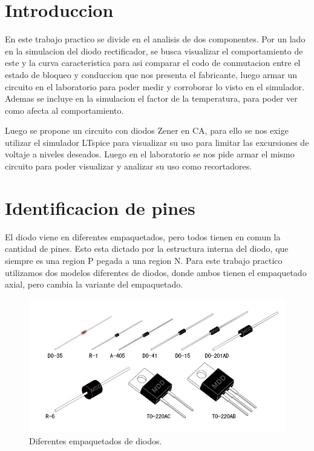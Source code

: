 \documentclass[chaptersright]{informeutn}
\begin{document}
  \maketitle

  \tableofcontents
  \setcounter{page}{1}
  \thispagestyle{plain}

  \chapter{Introduccion}
    En este trabajo practico se divide en el analisis de dos componentes. Por un lado en la simulacion del diodo
    rectificador, se busca visualizar el comportamiento de este y la curva caracteristica para asi comparar el codo de
    conmutacion entre el estado de bloqueo y conduccion que nos presenta el fabricante, luego armar un circuito en el
    laboratorio para poder medir y corroborar lo visto en el simulador. Ademas se incluye en la simulacion el factor de
    la temperatura, para poder ver como afecta al comportamiento.

    Luego se propone un circuito con diodos Zener en CA, para ello se nos exige utilizar el simulador LTspice para
    visualizar su uso para limitar las excursiones de voltaje a niveles deseados. Luego en el laboratorio se nos pide
    armar el mismo circuito para poder visualizar y analizar su uso como recortadores.

  \chapter{Identificacion de pines}
    El diodo viene en diferentes empaquetados, pero todos tienen en comun la cantidad de pines. Esto esta dictado por
    la estructura interna del diodo, que siempre es una region P pegada a una region N. Para este trabajo practico
    utilizamos dos modelos diferentes de diodos, donde ambos tienen el empaquetado axial, pero cambia la variante del
    empaquetado.
    \begin{figure}[!ht]
      \centering
      \includegraphics[width=.9\textwidth]{images/empaquetados_diodos.jpg}
      \caption{Diferentes empaquetados de diodos.}
    \end{figure}
\end{document}
